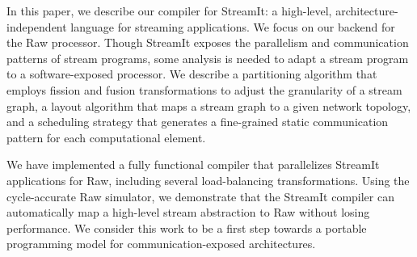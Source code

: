 In this paper, we describe our compiler for StreamIt: a high-level,
architecture-independent language for streaming applications.  We
focus on our backend for the Raw processor.  Though StreamIt exposes
the parallelism and communication patterns of stream programs, some
analysis is needed to adapt a stream program to a software-exposed
processor.  We describe a partitioning algorithm that employs fission
and fusion transformations to adjust the granularity of a stream
graph, a layout algorithm that maps a stream graph to a given network
topology, and a scheduling strategy that generates a fine-grained
static communication pattern for each computational element.

We have implemented a fully functional compiler that parallelizes
StreamIt applications for Raw, including several load-balancing
transformations.  Using the cycle-accurate Raw simulator, we
demonstrate that the StreamIt compiler can automatically map a
high-level stream abstraction to Raw without losing performance.  We
consider this work to be a first step towards a portable programming
model for communication-exposed architectures.
